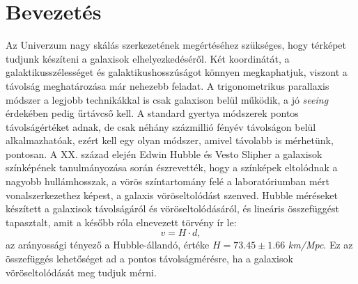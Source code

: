 \documentclass[12pt,letterpaper,twoside,openright]{book}
\renewcommand{\headrulewidth}{0pt}
\begin{document}
\tableofcontents


\pagestyle{fancy}
\lhead[\bfseries \leftmark]{\bfseries \rightmark}
\lhead[\bfseries \nouppercase{\rightmark}]{\bfseries \nouppercase{\leftmark}}
\chead{}
\rhead{\thepage}
\fancyfoot{}
\lfoot{}
\cfoot{}
\rfoot{}
\renewcommand{\headrulewidth}{0.4pt}
\renewcommand{\footrulewidth}{0pt}
\renewcommand{\sectionmark}[1]{\markright{\thesection.\ #1}}


\setcounter{page}{1}
\setcounter{section}{0}




\chapter{Bevezetés}
Az Univerzum nagy skálás szerkezetének megértéséhez szükséges, hogy térképet tudjunk készíteni a galaxisok elhelyezkedéséről. Két koordinátát, a galaktikusszélességet és galaktikushosszúságot könnyen megkaphatjuk, viszont a  távolság meghatározása már nehezebb feladat. A  trigonometrikus parallaxis módszer a legjobb technikákkal is csak galaxison belül működik, a jó \textit{seeing} érdekében pedig űrtávcső kell.  A standard gyertya módszerek pontos távolságértéket adnak, de csak néhány százmillió fényév távolságon belül alkalmazhatóak, ezért kell egy olyan módszer, amivel távolabb is mérhetünk, pontosan. 
\newline \indent
A XX. század elején Edwin Hubble és Vesto Slipher a galaxisok színképének tanulmányozása során észrevették, hogy a színképek eltolódnak a nagyobb hullámhosszak, a vörös színtartomány felé a laboratóriumban mért vonalszerkezethez képest, a galaxis vöröseltolódást szenved. Hubble méréseket készített a galaxisok távolságáról és vöröseltolódásáról, és lineáris összefüggést tapasztalt, amit a később róla elnevezett törvény ír le:
\begin{equation}
v = H\cdot d,
\end{equation}
az arányossági tényező a Hubble-állandó, értéke $ H = 73.45\pm1.66$ \textit{km/Mpc}. Ez az összefüggés lehetőséget ad  a pontos távolságmérésre, ha  a galaxisok vöröseltolódását meg tudjuk mérni. 
\newline \indent
\end{document}
